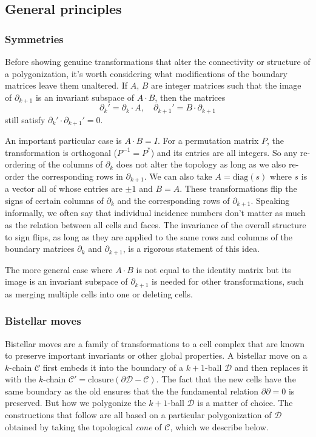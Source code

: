 \documentclass[twocolumn]{article}
\begin{document}
\subsection{General principles}

\subsubsection{Symmetries}

Before showing genuine transformations that alter the connectivity or structure of a polygonization, it's worth considering what modifications of the boundary matrices leave them unaltered.
If $A$, $B$ are integer matrices such that the image of $\partial_{k + 1}$ is an invariant subspace of $A\cdot B$, then the matrices
\begin{equation}
    \partial_k' = \partial_k\cdot A, \quad \partial_{k + 1}' = B\cdot\partial_{k + 1}
\end{equation}
still satisfy $\partial_k'\cdot\partial_{k + 1}' = 0$.

An important particular case is $A\cdot B = I$.
For a permutation matrix $P$, the transformation is orthogonal ($P^{-1} = P^*$) and its entries are all integers.
So any re-ordering of the columns of $\partial_k$ does not alter the topology as long as we also re-order the corresponding rows in $\partial_{k + 1}$.
We can also take $A = \text{diag}(s)$ where $s$ is a vector all of whose entries are $\pm 1$ and $B = A$.
These transformations flip the signs of certain columns of $\partial_k$ and the corresponding rows of $\partial_{k + 1}$.
Speaking informally, we often say that individual incidence numbers don't matter as much as the relation between all cells and faces.
The invariance of the overall structure to sign flips, as long as they are applied to the same rows and columns of the boundary matrices $\partial_k$ and $\partial_{k + 1}$, is a rigorous statement of this idea.

The more general case where $A\cdot B$ is not equal to the identity matrix but its image is an invariant subspace of $\partial_{k + 1}$ is needed for other transformations, such as merging multiple cells into one or deleting cells.

\subsubsection{Bistellar moves}

Bistellar moves are a family of transformations to a cell complex that are known to preserve important invariants or other global properties.
A bistellar move on a $k$-chain $\mathscr{C}$ first embeds it into the boundary of a $k + 1$-ball $\mathscr{D}$ and then replaces it with the $k$-chain $\mathscr C' = \text{closure}(\partial\mathscr D - \mathscr C)$.
The fact that the new cells have the same boundary as the old ensures that the the fundamental relation $\partial\partial = 0$ is preserved.
But how we polygonize the $k + 1$-ball $\mathscr{D}$ is a matter of choice.
The constructions that follow are all based on a particular polygonization of $\mathscr{D}$ obtained by taking the topological \emph{cone} of $\mathscr{C}$, which we describe below.
\end{document}
